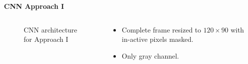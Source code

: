 \begin{frame}{\textbf{CNN Approach I}}
\begin{columns}
	\begin{column}{0.6\textwidth}
	\begin{figure}
		\centering
		\caption{CNN architecture for Approach I}
	\end{figure}
	\end{column}
	\begin{column}{0.4\textwidth}
	\begin{varblock}[0.85\textwidth]{}
		\begin{itemize}
			\item Complete frame resized to $120 \times 90$ with in-active pixels masked.
			\item Only gray channel.
		\end{itemize}
	\end{varblock}
	\end{column}
\end{columns}
\end{frame}

